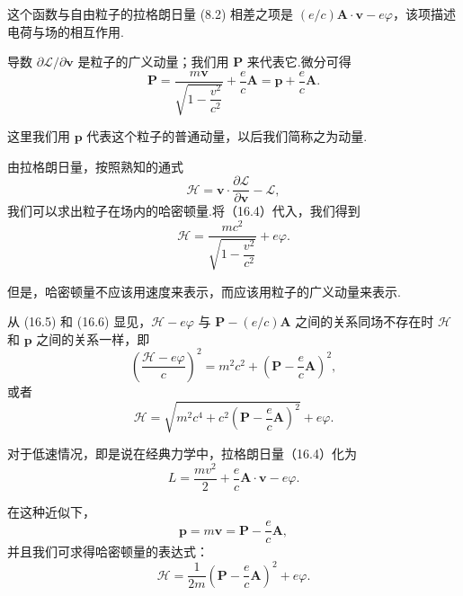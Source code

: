 这个函数与自由粒子的拉格朗日量 (8.2) 相差之项是
$(e/c)\boldsymbol{A}\cdot\boldsymbol{v}-e\varphi$，该项描述电荷与场的相互作用.

导数 $\partial\mathcal{L}/\partial\boldsymbol{v}$ 是粒子的广义动量；我们用 $\boldsymbol{P}$ 来代表它.微分可得
\begin{equation}
  \boldsymbol{P}=\frac{m\boldsymbol{v}}{\sqrt{1-\dfrac{v^2}{c^2}}}
  +\frac{e}{c}\boldsymbol{A}
  =\boldsymbol{p}+\frac{e}{c}\boldsymbol{A}.
\end{equation}

这里我们用 $\boldsymbol{p}$ 代表这个粒子的普通动量，以后我们简称之为动量.

由拉格朗日量，按照熟知的通式
\begin{equation*}
  \mathcal{H}=\boldsymbol{v}\cdot\frac{\partial\mathcal{L}}{\partial\boldsymbol{v}}-\mathcal{L},
\end{equation*}
我们可以求出粒子在场内的哈密顿量.将（16.4）代入，我们得到
\begin{equation}
  \mathcal{H}=\frac{mc^2}{\sqrt{1-\dfrac{v^2}{c^2}}}+e\varphi.
\end{equation}

但是，哈密顿量不应该用速度来表示，而应该用粒子的广义动量来表示.

从 (16.5) 和 (16.6) 显见，$\mathcal{H}-e\varphi$ 与
$\boldsymbol{P}-(e/c)\boldsymbol{A}$ 之间的关系同场不存在时
$\mathcal{H}$ 和 $\boldsymbol{p}$ 之间的关系一样，即
\begin{equation}
  \left(\frac{\mathcal{H}-e\varphi}{c}\right)^2=m^2c^2
  +\left(\boldsymbol{P}-\frac{e}{c}\boldsymbol{A}\right)^2,
\end{equation}
或者
\begin{equation}
  \mathcal{H}=\sqrt{m^2c^4+c^2\left(\boldsymbol{P}-\frac{e}{c}\boldsymbol{A}\right)^2}+e\varphi.
\end{equation}

对于低速情况，即是说在经典力学中，拉格朗日量（16.4）化为
\begin{equation}
  L=\frac{mv^2}{2}+\frac{e}{c}\boldsymbol{A}\cdot\boldsymbol{v}-e\varphi.
\end{equation}

在这种近似下，
\begin{equation*}
  \boldsymbol{p}=m\boldsymbol{v}
  =\boldsymbol{P}-\frac{e}{c}\boldsymbol{A},
\end{equation*}
并且我们可求得哈密顿量的表达式：
\begin{equation}
  \mathcal{H}=\frac{1}{2m}\left(\boldsymbol{P}-\frac{e}{c}\boldsymbol{A}\right)^2+e\varphi.
\end{equation}


